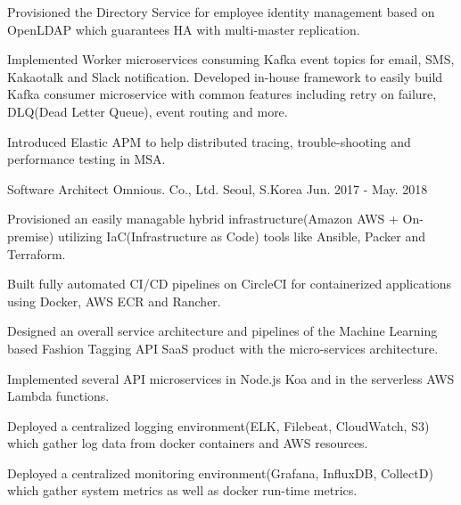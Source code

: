 \begin{cventries}
{\begin{cvitems}
        \item {Provisioned the Directory Service for employee identity management based on OpenLDAP which guarantees HA with multi-master replication.}
        \item {Implemented Worker microservices consuming Kafka event topics for email, SMS, Kakaotalk and Slack notification. Developed in-house framework to easily build Kafka consumer microservice with common features including retry on failure, DLQ(Dead Letter Queue), event routing and more.}
        \item {Introduced Elastic APM to help distributed tracing, trouble-shooting and performance testing in MSA.}
      \end{cvitems}
    }

  \cventry
    {Software Architect} %
    {Omnious. Co., Ltd.} %
    {Seoul, S.Korea} %
    {Jun. 2017 - May. 2018} %
    {
      \begin{cvitems} %
        \item {Provisioned an easily managable hybrid infrastructure(Amazon AWS + On-premise) utilizing IaC(Infrastructure as Code) tools like Ansible, Packer and Terraform.}
        \item {Built fully automated CI/CD pipelines on CircleCI for containerized applications using Docker, AWS ECR and Rancher.}
        \item {Designed an overall service architecture and pipelines of the Machine Learning based Fashion Tagging API SaaS product with the micro-services architecture.}
        \item {Implemented several API microservices in Node.js Koa and in the serverless AWS Lambda functions.}
        \item {Deployed a centralized logging environment(ELK, Filebeat, CloudWatch, S3) which gather log data from docker containers and AWS resources.}
        \item {Deployed a centralized monitoring environment(Grafana, InfluxDB, CollectD) which gather system metrics as well as docker run-time metrics.}
      \end{cvitems}
    }


\end{cventries}

